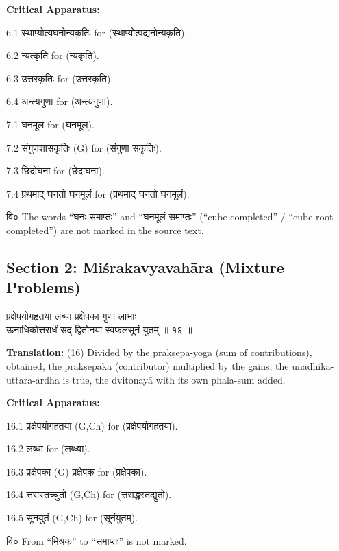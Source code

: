 \documentclass[11pt,a4paper]{article}
\newcommand{\dev}[1]{{\devanagarifont #1}}
\newcommand{\sanskritcol}[1]{%
  \begin{minipage}[t]{0.47\textwidth}
  \vspace{0pt}
  \begin{flushleft}
  #1
  \end{flushleft}
  \end{minipage}%
  \hfill
}
\newcommand{\englishcol}[1]{%
  \begin{minipage}[t]{0.47\textwidth}
  \vspace{0pt}
  \begin{flushleft}
  #1
  \end{flushleft}
  \end{minipage}%
}
\newenvironment{variants}{%
  \small%
  \color{varecolor}%
  \list{}{\leftmargin=2em\itemindent=-1em}%
}{\endlist}
\begin{document}
\vspace{0.4cm}
\textcolor{varecolor}{\textbf{Critical Apparatus:}}
\begin{variants}
\item[6.1] \dev{स्थाप्योत्यघनोन्यकृतिः} \dev{for} (\dev{स्थाप्योत्पद्यनोन्यकृति}).
\item[6.2] \dev{न्यत्कृति} \dev{for} (\dev{न्यकृति}).
\item[6.3] \dev{उत्तरकृतिः} \dev{for} (\dev{उत्तरकृति}).
\item[6.4] \dev{अन्त्यगुणा} \dev{for} (\dev{अन्त्यगुणा}).
\item[7.1] \dev{घनमूल} \dev{for} (\dev{घनमूल}).
\item[7.2] \dev{संगुणशासकृतिः} (G) \dev{for} (\dev{संगुणा सकृतिः}).
\item[7.3] \dev{छिदोघना} \dev{for} (\dev{छेदाघना}).
\item[7.4] \dev{प्रथमाद् घनतो घनमूलं} \dev{for} (\dev{प्रथमाद् घनतो घनमूलं}).
\item[\dev{वि०}] The words ``\dev{घनः समाप्तः}'' and ``\dev{घनमूलं समाप्तः}''
(``cube completed'' / ``cube root completed'') are not marked in the source text.
\end{variants}

\newpage


\subsection*{Section 2: Miśrakavyavahāra (Mixture Problems)}

\noindent
\sanskritcol{\dev{प्रक्षेपयोगहृतया लब्धा प्रक्षेपका गुणा लाभाः} \\ \dev{ऊनाधिकोत्तरार्धं सद् द्वितोनया स्वफलसूनं युतम् ॥ १६ ॥}}
\englishcol{\textbf{Translation:} (16) Divided by the prakṣepa-yoga (sum of contributions),
obtained, the prakṣepaka (contributor) multiplied by the gains; the ūnādhika-uttara-ardha
is true, the dvitonayā with its own phala-sum added.}

\vspace{0.4cm}
\textcolor{varecolor}{\textbf{Critical Apparatus:}}
\begin{variants}
\item[16.1] \dev{प्रक्षेपयोगहतया} (G,Ch) \dev{for} (\dev{प्रक्षेपयोगहतया}).
\item[16.2] \dev{लब्धा} \dev{for} (\dev{लब्ध्वा}).
\item[16.3] \dev{प्रक्षेपका} (G) \dev{प्रक्षेपक} \dev{for} (\dev{प्रक्षेपका}).
\item[16.4] \dev{त्तरास्तच्चुतो} (G,Ch) \dev{for} (\dev{त्तराद्धस्तद्युतो}).
\item[16.5] \dev{सूनयुतं} (G,Ch) \dev{for} (\dev{सूनंयुतम्}).
\item[\dev{वि०}] From ``\dev{मिश्रक}'' to ``\dev{समाप्तः}'' is not marked.
\end{variants}
\end{document}
